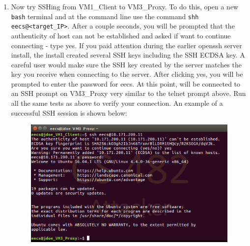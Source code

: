 \begin{enumerate}

\item Now try SSHing from VM1\_Client to VM3\_Proxy. To do this, open a new {\tt bash} terminal and at the command line use the command {\tt shh} {\tt eecs@<target\_IP>}. After a couple seconds, you will be prompted that the authenticity of host can not be established and asked if want to continue connecting - type yes. If you paid attention during the earlier openssh server install, the install created several SSH keys including the SSH ECDSA key. A careful user would make sure the SSH key created by the server matches the key you receive when connecting to the server. After clicking yes, you will be prompted to enter the password for eecs. At this point, will be connected to an SSH prompt on VM3\_Proxy very similar to the telnet prompt above. Run all the same tests as above to verify your connection. An example of a successful SSH session is shown below:
\begin{figure}[htb]
        \centering
        \includegraphics*[width=.7\textwidth]{Figs/ssh.png}
\end{figure}



\end{enumerate}
